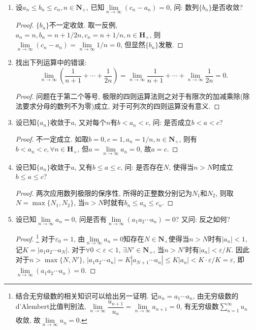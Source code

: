 \documentclass[a4paper,11pt,twoside]{ctexbook}
\begin{document}
\begin{enumerate}
\begin{proof}
		      $\{a_nb_n\}$可能发散也可能收敛. 如取$a_n=b_n=(-1)^n$, 则$a_nb_n=1$, $\{a_nb_n\}$收敛; 取$a_n=(-1)^n, b_n=n$, 则$a_nb_n=(-1)^n\cdot n$, $\{a_nb_n\}$发散.\qedhere
	      \end{proof}
	\item 设$a_n\leqslant b_n\leqslant c_n, n\in\mathbf{N}_{+}$, 已知$\lim\limits_{n\to\infty} (c_n-a_n)=0$, 问: 数列$\{b_n\}$是否收敛?
	      \begin{proof}
		      $\{b_n\}$不一定收敛. 取一反例, $a_n=n, b_n=n+1/2n, c_n=n+1/n, n\in\mathbf{H}_{+}$, 则$\lim\limits_{n\to\infty} (c_n-a_n)=\lim\limits_{n\to\infty} 1/n=0$, 但显然$\{b_n\}$发散.\qedhere
	      \end{proof}
	\item 找出下列运算中的错误:
	      \[
		      \lim\limits_{n\to\infty} \left(\dfrac{1}{n+1}+\cdots+\dfrac{1}{2n}\right)=\lim\limits_{n\to\infty}\dfrac{1}{n+1}+\cdots+\lim\limits_{n\to\infty}\dfrac{1}{2n}=0.
	      \]
	      \begin{proof}
		      问题在于第二个等号, 极限的四则运算法则之对于有限次的加减乘除(除法要求分母的数列不为零)成立, 对于可列次的四则运算没有意义.\qedhere
	      \end{proof}
	\item 设已知$\{a_n\}$收敛于$a$, 又对每个$n$有$b<a_n<c$, 问: 是否成立$b<a<c$?
	      \begin{proof}
		      不一定成立. 如取$b=0, c=1, a_n=1/n, n\in\mathbf{N}_{+}$, 则有$b<a_n<c, \forall n\in\mathbf{H}_{+}$, 但$a=\lim\limits_{n\to\infty} a_n=0$, 故$a=c$.\qedhere
	      \end{proof}
	\item 设已知$\{a_n\}$收敛于$a$, 又有$b\leqslant a\leqslant c$, 问: 是否存在$N$, 使得当$n>N$时成立$b\leqslant a\leqslant c$?
	      \begin{proof}
		      两次应用数列极限的保序性, 所得的正整数分别记为$N_1$和$N_2$, 则取$N=\max\{N_1,N_2\}$, 当$n>N$时就有$b_n\leqslant a_n\leqslant c_n$.\qedhere
	      \end{proof}
	\item 设已知$\lim\limits_{n\to\infty} a_n=0$, 问是否有$\lim\limits_{n\to\infty} (a_1a_2\cdots a_n)=0$? 又问: 反之如何?
	      \begin{proof}\footnote{结合无穷级数的相关知识可以给出另一证明. 记$u_n=a_1\cdots a_n$, 由无穷级数的d'Alembert比值判别法, $\lim\limits_{n\to\infty} \dfrac{u_{n+1}}{u_n}=\lim\limits_{n\to\infty} a_{n+1}=0$, 有无穷级数$\sum\limits_{n=1}^{\infty}u_n$收敛, 故$\lim\limits_{n\to\infty} u_n=0$.}
		      对于$\varepsilon_0=1$, 由$\lim\limits_{n\to\infty} a_n=0$知存在$N\in\mathbf{N}_{+}$使得当$n>N$时有$|a_n|<1$, 记$K=|a_1a_2\cdots a_N|$. 对于$\forall 0<\varepsilon<1$, $\exists N'\in\mathbf{N}_{+}$, 当$n>N'$时有$|a_n|<\varepsilon/K$. 因此对于$n>\max\{N,N'\}$, $|a_1a_2\cdots a_n|=K|a_{N+1}\cdots a_n|\leqslant K|a_n|<K\cdot\varepsilon/K=\varepsilon$, 即$\lim\limits_{n\to\infty} (a_1a_2\cdots a_n)=0$.\qedhere
	      \end{proof}
\end{enumerate}
\end{document}
